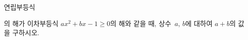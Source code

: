 연립부등식 \par\smallskip{}\par\smallskip\noindent 의 해가 이차부등식 $ax^2+bx-1\ge 0$의 해와 같을 때, 상수~$a$, $b$에 대하여 $a+b$의 값을 구하시오.

